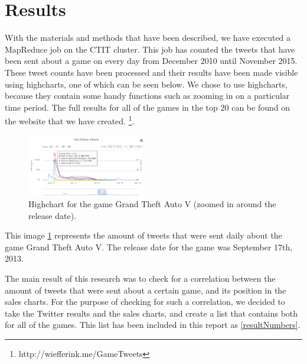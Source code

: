 \section{Results}
With the materials and methods that have been described, we have executed a MapReduce job on the CTIT cluster. This job has counted the tweets that have been sent about a game on every day from December 2010 until November 2015. These tweet counts have been processed and their results have been made visible using highcharts, one of which can be seen below. We chose to use highcharts, because they contain some handy functions such as zooming in on a particular time period. The full results for all of the games in the top 20 can be found on the website that we have created. \footnote{http://wiefferink.me/GameTweets}.

\begin{figure}[!ht]
	\centering
	\includegraphics[width=0.46\textwidth]{highchart-ghosts}
	\caption{Highchart for the game Grand Theft Auto V (zoomed in around the release date).}
	\label{highchartgta}
\end{figure}

This image \ref{highchartgta} represents the amount of tweets that were sent daily about the game Grand Theft Auto V.  The release date for the game was September 17th, 2013.

The main result of this research was to check for a correlation between the amount of tweets that were sent about a certain game, and its position in the sales charts. For the purpose of checking for such a correlation, we decided to take the Twitter results and the sales charts, and create a list that contains both for all of the games. This list has been included in this report as \ref{resultNumbers}.